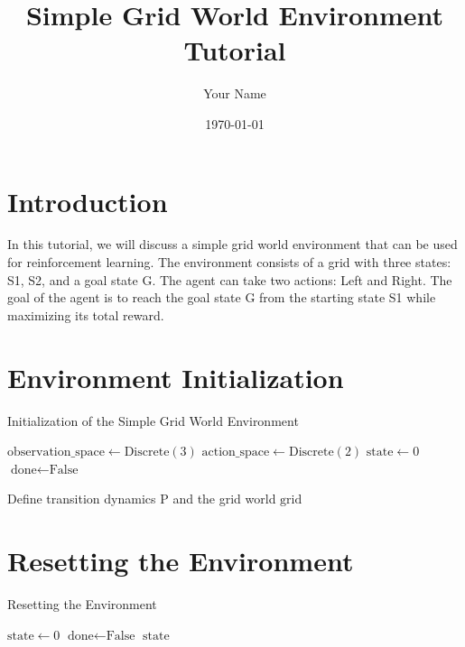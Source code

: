 \documentclass{article}
\title{Simple Grid World Environment Tutorial}
\author{Your Name}
\date{\today}
\begin{document}
\maketitle

\section{Introduction}
In this tutorial, we will discuss a simple grid world environment that can be used for reinforcement learning. The environment consists of a grid with three states: S1, S2, and a goal state G. The agent can take two actions: Left and Right. The goal of the agent is to reach the goal state G from the starting state S1 while maximizing its total reward.

\section{Environment Initialization}
\begin{algorithm}
\caption{Initialization of the Simple Grid World Environment}\label{alg:init}
\begin{algorithmic}[1]
\State $\text{observation\_space} \gets \text{Discrete}(3)$ 
\State $\text{action\_space} \gets \text{Discrete}(2)$ 
\State $\text{state} \gets 0$ 
\State $\text{done} \gets \text{False}$

\State Define transition dynamics $\text{P}$ and the grid world $\text{grid}$ 
\end{algorithmic}
\end{algorithm}

\section{Resetting the Environment}
\begin{algorithm}
\caption{Resetting the Environment}\label{alg:reset}
\begin{algorithmic}[1]
\State $\text{state} \gets 0$ 
\State $\text{done} \gets \text{False}$
\State \Return $\text{state}$
\end{algorithmic}
\end{algorithm}
\end{document}
